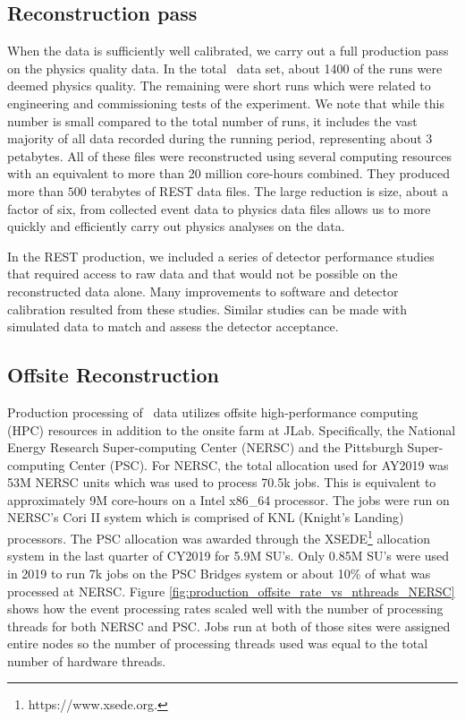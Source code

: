 \subsection{Reconstruction pass \label{sec:recreconstruction}}

When the data is sufficiently well calibrated, we carry out a full production pass on the physics quality data. In the total \GX~data set, about 1400 of the runs were deemed physics quality. The remaining were short runs which were related to engineering and commissioning tests of the experiment. We note that while this number is small compared to the total number of runs, it includes the vast majority of all data recorded during the running period, representing about 3 petabytes. All of these files were reconstructed using several computing resources with an equivalent to more than 20 million core-hours combined. They produced more than $500$ terabytes of REST data files. The large reduction is size, about a factor of six, from collected event data to physics data files allows us to  more quickly and efficiently carry out physics analyses on the data.

In the REST production, we included a series of detector performance studies that required access to raw data and that would not be possible on the reconstructed data alone. Many improvements to software and detector calibration resulted from these studies. Similar studies can be made with simulated data to match and assess the detector acceptance.

\subsection{Offsite Reconstruction}
\label{sec:recoffsite}

Production processing of \GX~data utilizes offsite high-performance computing (HPC) resources in addition to the onsite farm at JLab. Specifically, the National Energy Research Super-computing Center (NERSC) and the Pittsburgh Super-computing Center (PSC). For NERSC, the total allocation used for AY2019 was 53M NERSC units which was used to process 70.5k jobs. This is equivalent to approximately 9M core-hours on a Intel x86\_64 processor. The jobs were run on NERSC's Cori II system which is comprised of KNL (Knight's Landing) processors. The PSC allocation was awarded through the XSEDE\footnote{https://www.xsede.org.} allocation system in the last quarter of CY2019 for 5.9M SU's. Only 0.85M SU's were used in 2019 to run 7k jobs on the PSC Bridges system or about 10\% of what was processed at NERSC. Figure \ref{fig:production_offsite_rate_vs_nthreads_NERSC} shows how the event processing rates scaled well with the number of processing threads for both NERSC and PSC. Jobs run at both of those sites were assigned entire nodes so the number of processing threads used was equal to the total number of hardware threads.

